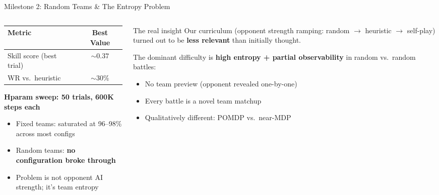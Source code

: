 \documentclass[aspectratio=169, 11pt]{beamer}
\begin{document}
\begin{frame}{Milestone 2: Random Teams \& The Entropy Problem}
  \begin{columns}[T]
    \begin{column}{0.48\textwidth}
      \begin{center}
        \small
        \begin{tabularx}{\textwidth}{l c}
          \toprule
          \textbf{Metric} & \textbf{Best Value} \\
          \midrule
          Skill score (best trial) & $\sim 0.37$ \\
          WR vs.\ heuristic        & $\sim 30\%$ \\
          \bottomrule
        \end{tabularx}
      \end{center}

      \vspace{0.4em}
      \textbf{Hparam sweep: 50 trials, 600K steps each}
      \begin{itemize}\setlength{\itemsep}{0.2em}
        \item Fixed teams: saturated at 96--98\% across most configs
        \item Random teams: \textbf{no configuration broke through}
        \item Problem is not opponent AI strength; it's team entropy
      \end{itemize}
    \end{column}

    \begin{column}{0.48\textwidth}
      \begin{alertblock}{The real insight}
        Our curriculum (opponent strength ramping: random $\to$ heuristic
        $\to$ self-play) turned out to be \textbf{less relevant} than
        initially thought.

        \vspace{0.3em}
        The dominant difficulty is \textbf{high entropy + partial
        observability} in random vs.\ random battles:
        \begin{itemize}\small
          \item No team preview (opponent revealed one-by-one)
          \item Every battle is a novel team matchup
          \item Qualitatively different: POMDP vs.\ near-MDP
        \end{itemize}
      \end{alertblock}
    \end{column}
  \end{columns}
\end{frame}
\end{document}
